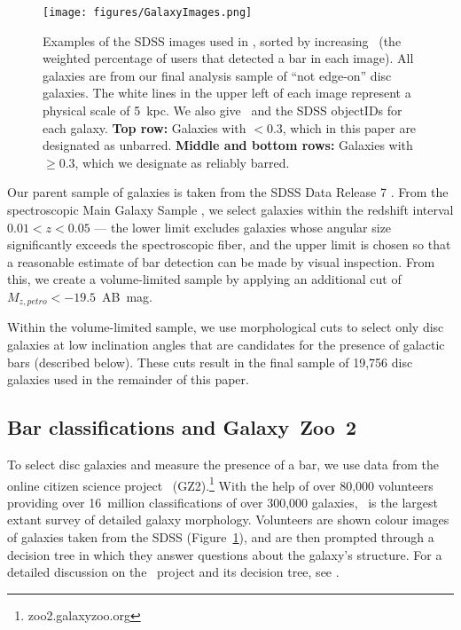 \begin{figure}
\centering
\texttt{[image: figures/GalaxyImages.png]}
\caption{Examples of the SDSS images used in \gztwo, sorted by increasing \pbar~(the weighted percentage of users that detected a bar in each image). All galaxies are from our final analysis sample of ``not edge-on'' disc galaxies. The white lines in the upper left of each image represent a physical scale of 5~kpc. We also give \pbar~and the SDSS objectIDs for each galaxy. \textbf{Top row:} Galaxies with \pbar$<0.3$, which in this paper are designated as unbarred. \textbf{Middle and bottom rows:} Galaxies with \pbar$\ge0.3$, which we designate as reliably barred.}
\label{gal}
\end{figure}

Our parent sample of galaxies is taken from the SDSS Data Release 7 \citep{Abazajian09}. From the spectroscopic Main Galaxy Sample \citep{Strauss2002}, we select galaxies within the redshift interval $0.01<z<0.05$ --- the lower limit excludes galaxies whose angular size significantly exceeds the spectroscopic fiber, and the upper limit is chosen so that a reasonable estimate of bar detection can be made by visual inspection. From this, we create a volume-limited sample by applying an additional cut of $M_{z,petro} < -19.5$~AB~mag. 

Within the volume-limited sample, we use morphological cuts to select only disc galaxies at low inclination angles that are candidates for the presence of galactic bars (described below). These cuts result in the final sample of 19,756 disc galaxies used in the remainder of this paper. 

\subsection{Bar classifications and Galaxy~Zoo~2}
To select disc galaxies and measure the presence of a bar, we use data from the online citizen science project \gztwo~(GZ2).\footnote{zoo2.galaxyzoo.org} With the help of over 80,000 volunteers providing over 16~million classifications of over 300,000 galaxies, \gztwo~is the largest extant survey of detailed galaxy morphology. Volunteers are shown colour images of galaxies taken from the SDSS (Figure~\ref{gal}), and are then prompted through a decision tree in which they answer questions about the galaxy's structure. For a detailed discussion on the \gztwo~project and its decision tree, see \citet{Willett2013}.



